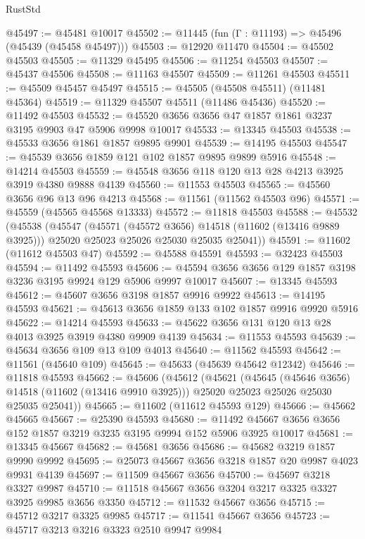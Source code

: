 \begin{lexlean}{RustStd}
\begin{coremodule}
@45497 := @45481 @10017
@45502 := @11445 (fun (Γ : @11193) => @45496 (@45439 (@45458 @45497)))
@45503 := @12920 @11470
@45504 := @45502 @45503
@45505 := @11329 @45495
@45506 := @11254 @45503
@45507 := @45437 @45506
@45508 := @11163 @45507
@45509 := @11261 @45503
@45511 := @45509 @45457 @45497
@45515 := @45505 (@45508 @45511) (@11481 @45364)
@45519 := @11329 @45507 @45511 (@11486 @45436)
@45520 := @11492 @45503
@45532 := @45520 @3656 @3656 @47 @1857 @1861 @3237 @3195 @9903 @47 @5906 @9998 @10017
@45533 := @13345 @45503
@45538 := @45533 @3656 @1861 @1857 @9895 @9901
@45539 := @14195 @45503
@45547 := @45539 @3656 @1859 @121 @102 @1857 @9895 @9899 @5916
@45548 := @14214 @45503
@45559 := @45548 @3656 @118 @120 @13 @28 @4213 @3925 @3919 @4380 @9888 @4139
@45560 := @11553 @45503
@45565 := @45560 @3656 @96 @13 @96 @4213
@45568 := @11561 (@11562 @45503 @96)
@45571 := @45559 (@45565 @45568 @13333)
@45572 := @11818 @45503
@45588 := @45532
    (@45538
      (@45547
        (@45571 (@45572 @3656) @14518 (@11602 (@13416 @9889 @3925)))
        @25020
        @25023
        @25026
        @25030
        @25035
        @25041))
@45591 := @11602 (@11612 @45503 @47)
@45592 := @45588 @45591
@45593 := @32423 @45503
@45594 := @11492 @45593
@45606 := @45594 @3656 @3656 @129 @1857 @3198 @3236 @3195 @9924 @129 @5906 @9997 @10017
@45607 := @13345 @45593
@45612 := @45607 @3656 @3198 @1857 @9916 @9922
@45613 := @14195 @45593
@45621 := @45613 @3656 @1859 @133 @102 @1857 @9916 @9920 @5916
@45622 := @14214 @45593
@45633 := @45622 @3656 @131 @120 @13 @28 @4013 @3925 @3919 @4380 @9909 @4139
@45634 := @11553 @45593
@45639 := @45634 @3656 @109 @13 @109 @4013
@45640 := @11562 @45593
@45642 := @11561 (@45640 @109)
@45645 := @45633 (@45639 @45642 @12342)
@45646 := @11818 @45593
@45662 := @45606
    (@45612
      (@45621
        (@45645 (@45646 @3656) @14518 (@11602 (@13416 @9910 @3925)))
        @25020
        @25023
        @25026
        @25030
        @25035
        @25041))
@45665 := @11602 (@11612 @45593 @129)
@45666 := @45662 @45665
@45667 := @25390 @45593
@45680 := @11492 @45667 @3656 @3656 @152 @1857 @3219 @3235 @3195 @9994 @152 @5906 @3925 @10017
@45681 := @13345 @45667
@45682 := @45681 @3656
@45686 := @45682 @3219 @1857 @9990 @9992
@45695 := @25073 @45667 @3656 @3218 @1857 @20 @9987 @4023 @9931 @4139
@45697 := @11509 @45667 @3656
@45700 := @45697 @3218 @3327 @9987
@45710 := @11518 @45667 @3656 @3204 @3217 @3325 @3327 @3925 @9985 @3656 @3350
@45712 := @11532 @45667 @3656
@45715 := @45712 @3217 @3325 @9985
@45717 := @11541 @45667 @3656
@45723 := @45717 @3213 @3216 @3323 @2510 @9947 @9984

\end{coremodule}
\end{lexlean}
